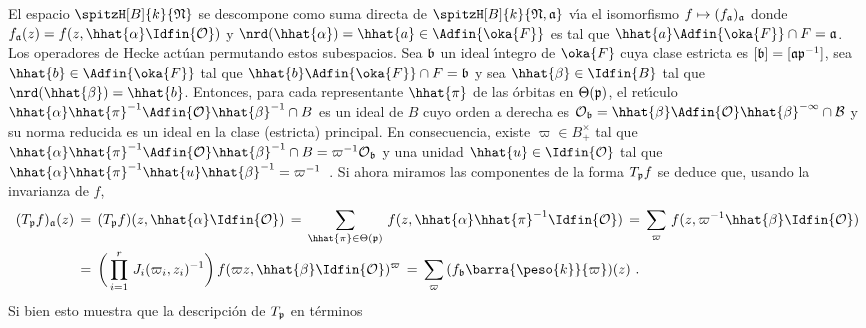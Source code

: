 El espacio $\spitzH[B]{k}{\frak{N}}$ se descompone como suma directa de
$\spitzH[B]{k}{\frak{N},\frak{a}}$ v\'{\i}a el isomorfismo
$f\mapsto(f_{\frak{a}})_{\frak{a}}$ donde
$f_{\frak{a}}(z)=f(z,\hhat{\alpha}\Idfin{\cal{O}})$ y
$\nrd(\hhat{\alpha})=\hhat{a}\in\Adfin{\oka{F}}$ es tal que
$\hhat{a}\Adfin{\oka{F}}\cap F=\frak{a}$. Los operadores de Hecke act\'{u}an
permutando estos subespacios. Sea $\frak{b}$ un ideal \'{\i}ntegro de $\oka{F}$
cuya clase estricta es $[\frak{b}]=[\frak{a}\frak{p}^{-1}]$, sea
$\hhat{b}\in\Adfin{\oka{F}}$ tal que $\hhat{b}\Adfin{\oka{F}}\cap F=\frak{b}$ y
sea $\hhat{\beta}\in\Idfin{B}$ tal que $\nrd(\hhat{\beta})=\hhat{b}$. Entonces,
para cada representante $\hhat{\pi}$ de las \'{o}rbitas en $\Theta(\frak{p})$,
el ret\'{\i}culo
\begin{math}
	\hhat{\alpha}\hhat{\pi}^{-1}\Adfin{\cal{O}}\hhat{\beta}^{-1}\cap B
\end{math}
es un ideal de $B$ cuyo orden a derecha es
\begin{math}
	\cal{O}_{\frak{b}}=\hhat{\beta}\Adfin{\cal{O}}\hhat{\beta}^{-1}\cap B
\end{math}
y su norma reducida es un ideal en la clase (estricta) principal. En
consecuencia, %
existe $\varpi\in B_{+}^{\times}$ tal que
\begin{math}
	\hhat{\alpha}\hhat{\pi}^{-1}\Adfin{\cal{O}}\hhat{\beta}^{-1}\cap B=
		\varpi^{-1}\cal{O}_{\frak{b}}
\end{math}
y una unidad $\hhat{u}\in\Idfin{\cal{O}}$ tal que
\begin{math}
	\hhat{\alpha}\hhat{\pi}^{-1}\hhat{u}\hhat{\beta}^{-1}=\varpi^{-1}
\end{math}~.
Si ahora miramos las componentes de la forma $T_{\frak{p}}f$ se deduce que,
usando la invarianza de $f$,
\begin{align*}
	(T_{\frak{p}}f)_{\frak{a}}(z) & \,=\,
		(T_{\frak{p}}f)(z,\hhat{\alpha}\Idfin{\cal{O}}) \,=\,
		\sum_{\hhat{\pi}\in\Theta(\frak{p})}\,
			f(z,\hhat{\alpha}\hhat{\pi}^{-1}\Idfin{\cal{O}})
		\,=\, \sum_{\varpi}\,
			f(z,\varpi^{-1}\hhat{\beta}\Idfin{\cal{O}}) \\
	& \,=\, \bigg(\prod_{i=1}^{r}\,J_{i}(\varpi_{i},z_{i})^{-1}\bigg)\,
		f(\varpi z,\hhat{\beta}\Idfin{\cal{O}})^{\varpi}
	\,=\, \sum_{\varpi}\,(f_{\frak{b}}\barra{\peso{k}}{\varpi})(z)
	\text{ .}
\end{align*}
%
Si bien esto muestra que la descripci\'{o}n de $T_{\frak{p}}$ en t\'{e}rminos
